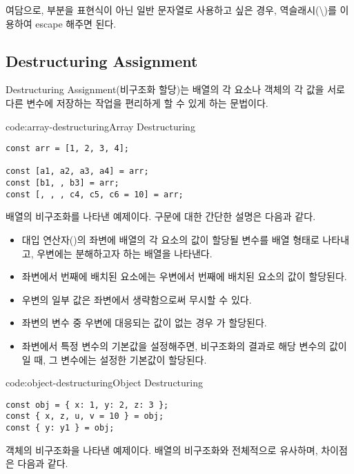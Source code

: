 여담으로, \cd{\$\textbraceleft\textbraceright} 부분을 표현식이 아닌 일반 문자열로 사용하고 싶은 경우, 역슬래시(\cd\textbackslash)를 이용하여 escape 해주면 된다.

\subsection*{Destructuring Assignment}

Destructuring Assignment(비구조화 할당)는 배열의 각 요소나 객체의 각 값을 서로 다른 변수에 저장하는 작업을 편리하게 할 수 있게 하는 문법이다.

\begin{codeenv}{code:array-destructuring}{Array Destructuring}\begin{verbatim}
const arr = [1, 2, 3, 4];

const [a1, a2, a3, a4] = arr;
const [b1, , b3] = arr;
const [, , , c4, c5, c6 = 10] = arr;
\end{verbatim}
\end{codeenv}

\은 배열의 비구조화를 나타낸 예제이다. 구문에 대한 간단한 설명은 다음과 같다.

\begin{itemize}
    \item 대입 연산자(\cd{=})의 좌변에 배열의 각 요소의 값이 할당될 변수를 배열 형태로 나타내고, 우변에는 분해하고자 하는 배열을 나타낸다.
    \item 좌변에서 번째에 배치된 요소에는 우변에서 번째에 배치된 요소의 값이 할당된다.
    \item 우변의 일부 값은 좌변에서 생략함으로써 무시할 수 있다.
    \item 좌변의 변수 중 우변에 대응되는 값이 없는 경우 가 할당된다.
    \item 좌변에서 특정 변수의 기본값을 설정해주면, 비구조화의 결과로 해당 변수의 값이 일 때, 그 변수에는 설정한 기본값이 할당된다.
\end{itemize}

\begin{codeenv}{code:object-destructuring}{Object Destructuring}\begin{verbatim}
const obj = { x: 1, y: 2, z: 3 };
const { x, z, u, v = 10 } = obj;
const { y: y1 } = obj;
\end{verbatim}
\end{codeenv}

\은 객체의 비구조화을 나타낸 예제이다. 배열의 비구조화와 전체적으로 유사하며, 차이점은 다음과 같다.

